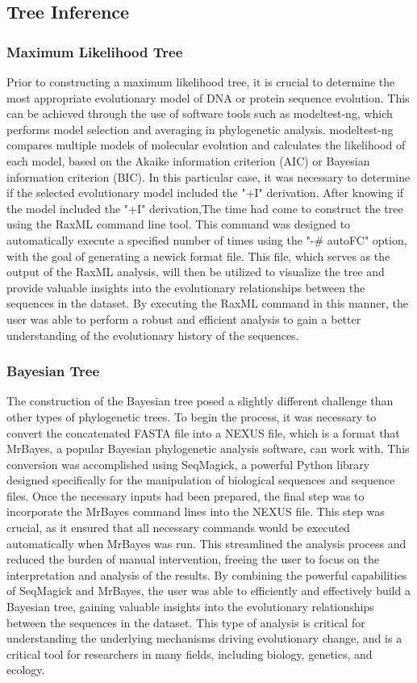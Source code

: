 \documentclass[12pt]{article}
\begin{document}
\subsection{Tree Inference}
\subsubsection{Maximum Likelihood Tree}
Prior to constructing a maximum likelihood tree, it is crucial to determine the most appropriate evolutionary model of DNA or protein sequence evolution. This can be achieved through the use of software tools such as modeltest-ng, which performs model selection and averaging in phylogenetic analysis. modeltest-ng compares multiple models of molecular evolution and calculates the likelihood of each model, based on the Akaike information criterion (AIC) or Bayesian information criterion (BIC). In this particular case, it was necessary to determine if the selected evolutionary model included the "+I" derivation. After knowing if the model included the "+I" derivation,The time had come to construct the tree using the RaxML command line tool. This command was designed to automatically execute a specified number of times using the "-\# autoFC" option, with the goal of generating a newick format file. This file, which serves as the output of the RaxML analysis, will then be utilized to visualize the tree and provide valuable insights into the evolutionary relationships between the sequences in the dataset. By executing the RaxML command in this manner, the user was able to perform a robust and efficient analysis to gain a better understanding of the evolutionary history of the sequences.
\subsubsection{Bayesian Tree}
The construction of the Bayesian tree posed a slightly different challenge than other types of phylogenetic trees. To begin the process, it was necessary to convert the concatenated FASTA file into a NEXUS file, which is a format that MrBayes, a popular Bayesian phylogenetic analysis software, can work with. This conversion was accomplished using SeqMagick, a powerful Python library designed specifically for the manipulation of biological sequences and sequence files.\newline
Once the necessary inputs had been prepared, the final step was to incorporate the MrBayes command lines into the NEXUS file. This step was crucial, as it ensured that all necessary commands would be executed automatically when MrBayes was run. This streamlined the analysis process and reduced the burden of manual intervention, freeing the user to focus on the interpretation and analysis of the results.\newline
By combining the powerful capabilities of SeqMagick and MrBayes, the user was able to efficiently and effectively build a Bayesian tree, gaining valuable insights into the evolutionary relationships between the sequences in the dataset. This type of analysis is critical for understanding the underlying mechanisms driving evolutionary change, and is a critical tool for researchers in many fields, including biology, genetics, and ecology.
\end{document}

